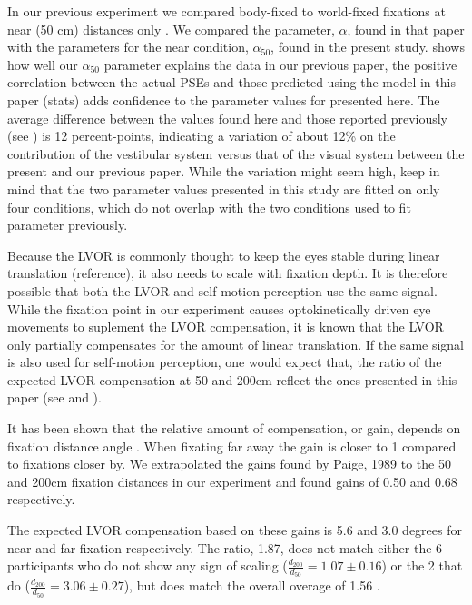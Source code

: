 In our previous experiment we compared body-fixed to world-fixed fixations at near (50 \si{\centi\metre}) distances only \cite{clemens2015a}. We compared the parameter, $\alpha$, found in that paper with the parameters for the near condition, $\alpha_{50}$, found in the present study.  shows how well our $\alpha_{50}$ parameter explains the data in our previous paper, the positive correlation between the actual PSEs and those predicted using the model in this paper (stats) adds confidence to the parameter values for  presented here. The average difference between the values found here and those reported previously (see ) is 12  percent-points, indicating a variation of about 12\% on the contribution of the vestibular system versus that of the visual system between the present and our previous paper. While the variation might seem high, keep in mind that the two parameter values presented in this study are fitted on only four conditions, which do not overlap with the two conditions used to fit  parameter  previously.

Because the LVOR is commonly thought to keep the eyes stable during linear translation (reference), it also needs to scale with fixation depth. It is therefore possible that both the LVOR and self-motion perception use the same signal. While the fixation point in our experiment causes optokinetically driven eye movements to suplement the LVOR compensation, it is known that the LVOR only partially compensates for the amount of linear translation. If the same signal is also used for self-motion perception, one would expect that, the ratio of the expected LVOR compensation at 50 and 200cm reflect the ones presented in this paper (see  and ).

It has been shown that the relative amount of compensation, or gain, depends on fixation distance angle \cite{paige1989, busettini1994,paige1998}. When fixating far away the gain is closer to 1 compared to fixations closer by. We extrapolated the gains found by Paige, 1989 to the 50 and 200cm fixation distances in our experiment and found gains of 0.50 and 0.68 respectively.

The expected LVOR compensation based on these gains is 5.6 and 3.0 degrees for near and far fixation respectively. The ratio, 1.87, does not match either the 6 participants who do not show any sign of scaling ($\frac{d_{200}}{d_{50}} = 1.07 \pm 0.16$) or the 2 that do ($\frac{d_{200}}{d_{50}} = 3.06 \pm 0.27$), but does match the overall overage of  1.56 .

